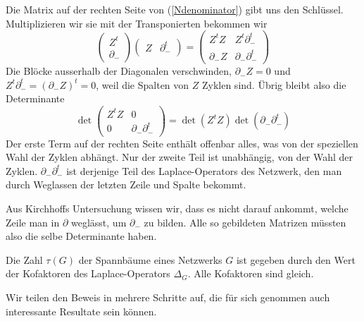 Die Matrix auf der rechten Seite von (\ref{Ndenominator}) gibt uns den
Schlüssel. Multiplizieren wir sie mit der Transponierten bekommen
wir
\begin{equation}
\begin{pmatrix}
Z^t\\
\partial_-
\end{pmatrix}
\begin{pmatrix}
Z&\partial_-^t
\end{pmatrix}
=\begin{pmatrix}
Z^tZ&Z^t\partial_-^t\\
\partial_-Z&\partial_-\partial_-^t
\end{pmatrix}
\end{equation}
Die Blöcke ausserhalb der Diagonalen verschwinden, $\partial_-Z=0$
und $Z^t\partial_-^t=(\partial_-Z)^t=0$, weil die Spalten von $Z$ Zyklen sind.
Übrig bleibt also die Determinante
\begin{equation}
\det
\begin{pmatrix}
Z^tZ&0\\
0&\partial_-\partial_-^t
\end{pmatrix}
=\det(Z^tZ)\det(\partial_-\partial_-^t)
\end{equation}
Der erste Term auf der rechten Seite enthält offenbar alles, was von
der speziellen Wahl der Zyklen abhängt. Nur der zweite Teil ist
unabhängig, von der Wahl der Zyklen. $\partial_-\partial_-^t$ ist derjenige
Teil des Laplace-Operators des Netzwerk, den man durch Weglassen der
letzten Zeile und Spalte bekommt.

Aus Kirchhoffs Untersuchung wissen
wir, dass es nicht darauf ankommt, welche Zeile man in $\partial$ 
weglässt, um $\partial_-$ zu bilden. Alle so gebildeten
Matrizen müssten also die selbe Determinante haben.

\begin{satz} Die Zahl $\tau(G)$
\label{matrixtreetheorem}
der Spannbäume eines
Netzwerks $G$ ist gegeben durch den Wert der Kofaktoren des Laplace-Operators
$\Delta_G$.
Alle Kofaktoren sind gleich.
\end{satz}
Wir teilen den Beweis in mehrere Schritte auf, die für sich genommen
auch interessante Resultate sein können. 

